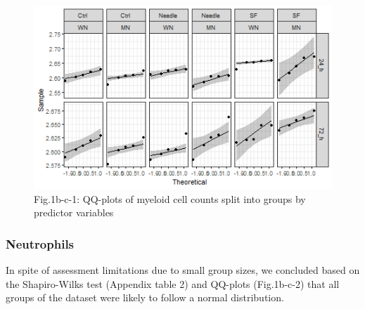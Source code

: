 \documentclass[
  12pt,
  letterpaper,
]{article}
\begin{document}
\begin{figure}[H]

{\centering \includegraphics[width=0.95\linewidth,]{Statistics_Report_files/figure-latex/qq-plot-figure-1b-c-myeloid-cells-1} 

}

\caption{Fig.1b-c-1: QQ-plots of myeloid cell counts split into groups by predictor variables}\label{fig:qq-plot-figure-1b-c-myeloid-cells}
\end{figure}

\subsubsection{Neutrophils}\label{neutrophils}

In spite of assessment limitations due to small group sizes, we concluded based on the Shapiro-Wilks test (Appendix table 2) and QQ-plots (Fig.1b-c-2) that all groups of the dataset were likely to follow a normal distribution.
\end{document}
